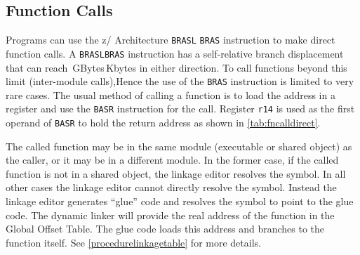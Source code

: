\documentclass[USenglish,fontsize=11pt,twoside,%
  toc=bib,toc=idx,toc=graduated,numbers=noendperiod,
  bookmarks=true,
  bookmarksnumbered=true,
  bookmarksopen=true,
  bookmarksopenlevel=1,
  breaklinks=true,
  colorlinks=true,
  linkcolor=black,
  pdfpagelayout={TwoPageRight},
  pdfusetitle=true
]{scrreprt}
\newcommand{\ARCH}{z/\kern-1pt Ar\-chi\-tec\-ture}
\newcommand{\ARCH}{ESA/390}
\begin{document}
\subsection{Function Calls}
Programs can use the \ARCH{} {\ifzseries\texttt{BRASL}\else
  \texttt{BRAS}\fi} instruction to make direct function calls.
A {\ifzseries \texttt{BRASL}\else \texttt{BRAS}\fi} instruction has a
self-relative branch displacement that can reach {$\,$GBytes$\,$Kbytes\fi} in either direction.  {\ifzseries
  To call functions beyond this limit (inter-module calls),\else Hence
  the use of the \texttt{BRAS} instruction is limited to very rare
  cases.  The usual method of calling a function is to\fi} load the
address in a register and use the \texttt{BASR} instruction for the
call.  Register \texttt{r14} is used as the first operand of \texttt{BASR}
to hold the return address as shown in \cref{tab:fncalldirect}.

The called function may be in the same module (executable or shared
object) as the caller, or it may be in a different module.  In the
former case, if the called function is not in a shared object, the
linkage editor resolves the symbol.  In all other cases the linkage
editor cannot directly resolve the symbol.  Instead the linkage editor
generates ``glue'' code and resolves the symbol to point to the glue
code.  The dynamic linker will provide the real address of the
function in the Global Offset Table.  The glue code loads this address
and branches to the function itself.  See
\cref{procedurelinkagetable} for more details.
\end{document}
